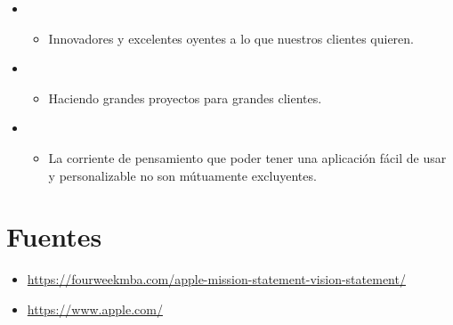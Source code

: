 \documentclass{article}
\begin{document}
\begin{itemize}
\begin{itemize}
            \item {} 
                \begin{itemize}
                    \item Innovadores y excelentes oyentes a lo que nuestros clientes quieren.
                \end{itemize}
                
            \item {} 
                \begin{itemize}
                    \item Haciendo grandes proyectos para grandes clientes.
                \end{itemize}
                
            \item {} 
                \begin{itemize}
                    \item La corriente de pensamiento que poder tener una aplicación fácil de usar y personalizable no son mútuamente excluyentes.
                \end{itemize}
        \end{itemize}
\end{itemize}





\section{Fuentes}
\begin{itemize}
    \item \url{https://fourweekmba.com/apple-mission-statement-vision-statement/}
    \item \url{https://www.apple.com/}
\end{itemize}
\end{document}
